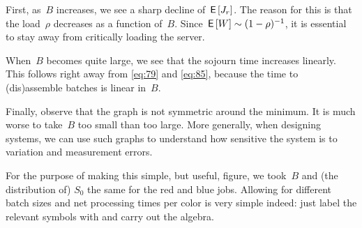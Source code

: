 \documentclass[queueing-book.tex]{subfiles}
\begin{document}
First, as~$B$ increases, we see a sharp decline of $\,\mathsf{E}\left[J_r\right]$.
The reason for this is that the load~$\rho$ decreases as a function of~$B$.
Since $\,\mathsf{E}\left[W\right] \sim (1-\rho)^{-1}$, it is essential to stay away from critically loading the server.


When~$B$ becomes quite large, we see that the sojourn time  increases linearly.
This follows right away from \cref{eq:79} and \cref{eq:85}, because the time to (dis)assemble batches is  linear in~$B$.

Finally, observe that the graph is not symmetric around the minimum.
It is much worse to take~$B$ too small than too large.
More generally, when designing systems, we can use such graphs to understand how sensitive the system is to variation and measurement errors.


For the purpose of making this simple, but useful, figure, we took~$B$ and (the distribution of) $S_{0}$ the same for the red and blue jobs.
Allowing for different batch sizes and net processing times per color is very simple indeed: just label the relevant symbols with and carry out the algebra.
\end{document}
